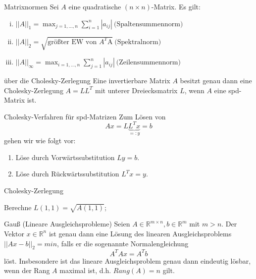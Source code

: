 \begin{flashcard}[Satz]{Matrixnormen}
Sei $A$ eine quadratische $(n \times n)$-Matrix. Es gilt:
\begin{enumerate}[(i)]
	\item $\displaystyle ||A||_1 = \max_{j=1,\ldots,n} \sum_{i=1}^n |a_{ij}| \ \text{(Spaltensummennorm)}$
	\item $\displaystyle ||A||_2 = \sqrt{\text{größter EW von $A^T$A}} \ \text{(Spektralnorm)}$
	\item $\displaystyle ||A||_\infty = \max_{i=1,\ldots,n} \sum_{j=1}^n |a_{ij}| \ \text{(Zeilensummennorm)}$
\end{enumerate}
\end{flashcard}

\begin{flashcard}[Satz]{über die Cholesky-Zerlegung}
Eine invertierbare Matrix $A$ besitzt genau dann eine Cholesky-Zerlegung $A = LL^T$ mit unterer Dreiecksmatrix $L$, wenn $A$ eine spd-Matrix ist.
\end{flashcard}

\begin{flashcard}[Algorithmus]{Cholesky-Verfahren für spd-Matrizen}
Zum Lösen von
$$Ax = L \underbrace{L^T x}_{=:y} = b$$
gehen wir wie folgt vor:
\begin{enumerate}
	\item Löse durch Vorwärtssubstitution $Ly = b$.
	\item Löse durch Rückwärtssubstitution $L^Tx = y$.
\end{enumerate}
\end{flashcard}

\begin{flashcard}[Algorithmus]{Cholesky-Zerlegung}
\begin{algorithm}[H]
	Berechne $L(1,1) = \sqrt{A(1,1)}$;\\
\end{algorithm}
\end{flashcard}

\begin{flashcard}[Satz]{Gauß (Lineare Ausgleichsprobleme)}
Seien $A \in \mathbb{R}^{m \times n}, b \in \mathbb{R}^m$ mit $m > n$. Der Vektor $x \in \mathbb{R}^n$ ist genau dann eine Lösung des linearen Ausgleichsproblems $||Ax -b||_2 = min$, falls er die sogenannte Normalengleichung
$$A^TAx = A^Tb$$
löst. Insbesondere ist das lineare Ausgleichsproblem genau dann eindeutig lösbar, wenn der Rang $A$ maximal ist, d.h. $Rang(A) = n$ gilt.
\end{flashcard}


